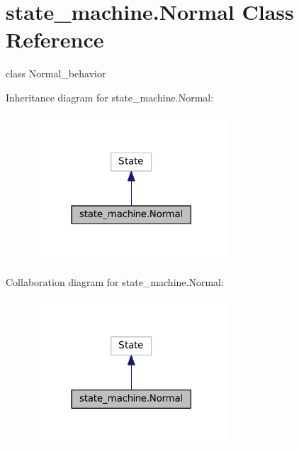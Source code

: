 \hypertarget{classstate__machine_1_1Normal}{}\section{state\+\_\+machine.\+Normal Class Reference}
\label{classstate__machine_1_1Normal}


class Normal\+\_\+behavior  




Inheritance diagram for state\+\_\+machine.\+Normal\+:
\nopagebreak
\begin{figure}[H]
\begin{center}
\leavevmode
\includegraphics[width=206pt]{classstate__machine_1_1Normal__inherit__graph}
\end{center}
\end{figure}


Collaboration diagram for state\+\_\+machine.\+Normal\+:
\nopagebreak
\begin{figure}[H]
\begin{center}
\leavevmode
\includegraphics[width=206pt]{classstate__machine_1_1Normal__coll__graph}
\end{center}
\end{figure}
